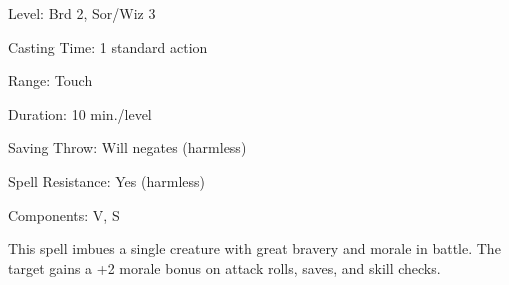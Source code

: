 
\begin{description*}
\item[Level:] Brd 2, Sor/Wiz 3
\item[Casting Time:] 1 standard action
\item[Range:] Touch
\item[Duration:] 10 min./level
\item[Saving Throw:] Will negates (harmless)
\item[Spell Resistance:] Yes (harmless)
\item[Components:] V, S
\end{description*}

This spell imbues a single creature with great bravery and morale in battle. The
target gains a +2 morale bonus on attack rolls, saves, and skill checks.